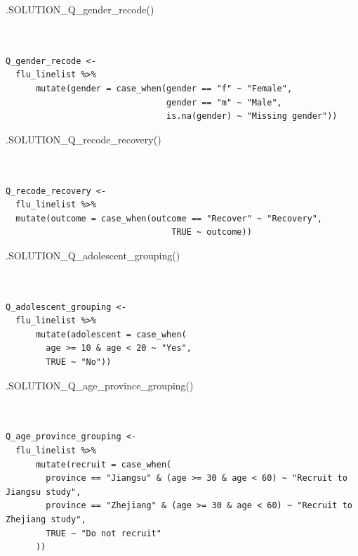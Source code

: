 \documentclass[
  letterpaper,
  DIV=11,
  numbers=noendperiod]{scrreprt}
\newenvironment{Shaded}{\begin{snugshade}}{\end{snugshade}}
\newcommand{\FunctionTok}[1]{\textcolor[rgb]{0.28,0.35,0.67}{#1}}
\newcommand{\NormalTok}[1]{\textcolor[rgb]{0.00,0.23,0.31}{#1}}
\begin{document}
\begin{Shaded}
\begin{Highlighting}[]
\FunctionTok{.SOLUTION\_Q\_gender\_recode}\NormalTok{()}
\end{Highlighting}
\end{Shaded}

\begin{verbatim}


Q_gender_recode <- 
  flu_linelist %>%  
      mutate(gender = case_when(gender == "f" ~ "Female",
                                gender == "m" ~ "Male",
                                is.na(gender) ~ "Missing gender"))
\end{verbatim}

\begin{Shaded}
\begin{Highlighting}[]
\FunctionTok{.SOLUTION\_Q\_recode\_recovery}\NormalTok{()}
\end{Highlighting}
\end{Shaded}

\begin{verbatim}


Q_recode_recovery <- 
  flu_linelist %>% 
  mutate(outcome = case_when(outcome == "Recover" ~ "Recovery", 
                                 TRUE ~ outcome))
\end{verbatim}

\begin{Shaded}
\begin{Highlighting}[]
\FunctionTok{.SOLUTION\_Q\_adolescent\_grouping}\NormalTok{()}
\end{Highlighting}
\end{Shaded}

\begin{verbatim}


Q_adolescent_grouping <- 
  flu_linelist %>% 
      mutate(adolescent = case_when(
        age >= 10 & age < 20 ~ "Yes",
        TRUE ~ "No"))
\end{verbatim}

\begin{Shaded}
\begin{Highlighting}[]
\FunctionTok{.SOLUTION\_Q\_age\_province\_grouping}\NormalTok{()}
\end{Highlighting}
\end{Shaded}

\begin{verbatim}


Q_age_province_grouping <- 
  flu_linelist %>% 
      mutate(recruit = case_when(
        province == "Jiangsu" & (age >= 30 & age < 60) ~ "Recruit to Jiangsu study",
        province == "Zhejiang" & (age >= 30 & age < 60) ~ "Recruit to Zhejiang study",
        TRUE ~ "Do not recruit"
      ))
\end{verbatim}
\end{document}
